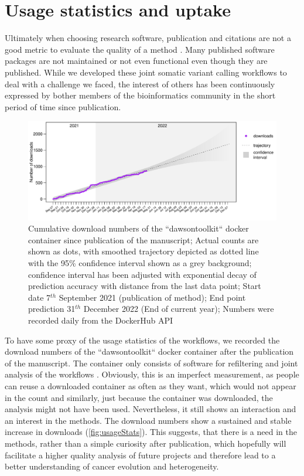 \section[Usage]{Usage statistics and uptake}
\label{variantcalling-sec:usage}
Ultimately when choosing research software, publication and citations are not a good metric to evaluate the quality of a method \cite{Gardner2022}. Many published software packages are not maintained or not even functional even though they are published. While we developed these joint somatic variant calling workflows to deal with a challenge we faced, the interest of others has been continuously expressed by bother members of the bioinformatics community  in the short period of time since publication.

\begin{figure}[!ht]
\centering
\includegraphics[width=.99\linewidth]{Figures/jointVariantCalling/dawsontoolkitDownloads.pdf}
\caption[Usage statistics joint workflows]{Cumulative download numbers of the ``dawsontoolkit`` docker container since publication of the manuscript; Actual counts are shown as dots, with smoothed trajectory depicted as dotted line with the 95\% confidence interval shown as a grey background; confidence interval has been adjusted with exponential decay of prediction accuracy with distance from the last data point; Start date 7$^{th}$ September 2021 (publication of method); End point prediction 31$^{th}$ December 2022 (End of current year); Numbers were recorded daily from the DockerHub API}\label{fig:usageStats}
\end{figure}

To have some proxy of the usage statistics of the workflows, we recorded the download numbers of the ``dawsontoolkit`` docker container after the publication of the manuscript. The container only consists of software for refiltering and joint analysis of the workflows . Obviously, this is an imperfect measurement, as people can reuse a downloaded container as often as they want, which would not appear in the count and similarly, just because the container was downloaded, the analysis might not have been used. Nevertheless, it still shows  an interaction and an interest in the methods. The download numbers show a sustained and stable increase in downloads (\autoref{fig:usageStats}). This suggests, that there is a need in the methods, rather than a simple curiosity after publication, which hopefully will facilitate a higher quality analysis of future projects and therefore lead to a better understanding of cancer evolution and heterogeneity.
